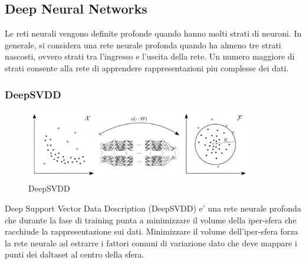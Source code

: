 \subsection{Deep Neural Networks}
Le reti neurali vengono definite profonde quando hanno molti strati di neuroni. In generale, si considera una rete neurale profonda quando ha almeno tre strati nascosti, ovvero strati tra l'ingresso e l'uscita della rete. Un numero maggiore di strati consente alla rete di apprendere rappresentazioni piu complesse dei dati.
\subsubsection{DeepSVDD}
\begin{figure}[t]
	\centering
	\includegraphics[width=10cm, scale=1]{images/deepsvdd}
	\caption{DeepSVDD}
	\label{deepsvdd}
\end{figure}

Deep Support Vector Data Description (DeepSVDD) e' una rete neurale profonda che durante la fase di training punta a minimizzare il volume della iper-sfera che racchiude la rappresentazione sui dati. Minimizzare il volume dell'iper-sfera forza la rete neurale ad estrarre i fattori comuni di variazione dato che deve mappare i punti dei daltaset al centro della sfera. 

